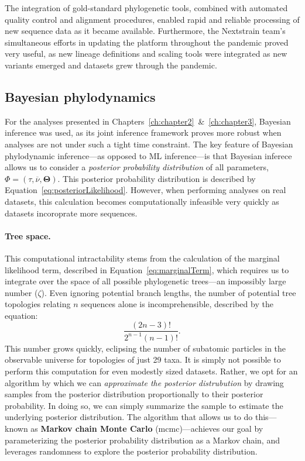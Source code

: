 The integration of gold-standard phylogenetic tools, combined with automated quality control and alignment procedures, enabled rapid and reliable processing of new sequence data as it became available.
Furthermore, the Nextstrain team's simultaneous efforts in updating the platform throughout the pandemic proved very useful, as new lineage definitions and scaling tools were integrated as new variants emerged and datasets grew through the pandemic.

\subsection{Bayesian phylodynamics}
For the analyses presented in Chapters~\ref{ch:chapter2}~\&~\ref{ch:chapter3}, Bayesian inference was used, as its joint inference framework proves more robust when analyses are not under such a tight time constraint.
The key feature of Bayesian phylodynamic inference---as opposed to ML inference---is that Bayesian inferece allows us to consider a \textit{posterior probability distribution} of all parameters, $\Phi = (\tau,\overline{\nu},\mathbf{\Theta})$.
This posterior probability distribution is described by Equation~\ref{eq:posteriorLikelihood}.
However, when performing analyses on real datasets, this calculation becomes computationally infeasible very quickly as datasets incoroprate more sequences.

\paragraph*{Tree space.}
This computational intractability stems from the calculation of the marginal likelihood term, described in Equation~\ref{eq:marginalTerm}, which requires us to integrate over the space of all possible phylogenetic trees---an impossibly large number ($\zeta$).
Even ignoring potential branch lengths, the number of potential tree topologies relating $n$ sequences alone is incomprehensible, described by the equation:
\begin{equation}
  \label{eq:treeSpace}
  \frac{(2n-3)!}{2^{n-1}(n-1)!}.
\end{equation}
This number grows quickly, eclipsing the number of subatomic particles in the observable universe \citep{padilla2022fantastic} for topologies of just 29 taxa.
It is simply not possible to perform this computation for even modestly sized datasets.
Rather, we opt for an algorithm by which we can \textit{approximate the posterior distrubution} by drawing samples from the posterior distribution proportionally to their posterior probability.
In doing so, we can simply summarize the sample to estimate the underlying posterior distribution.
The algorithm that allows us to do this---known as \textbf{Markov chain Monte Carlo} (\gls{mcmc})---achieves our goal by parameterizing the posterior probability distribution as a Markov chain, and leverages randomness to explore the posterior probability distribution.

